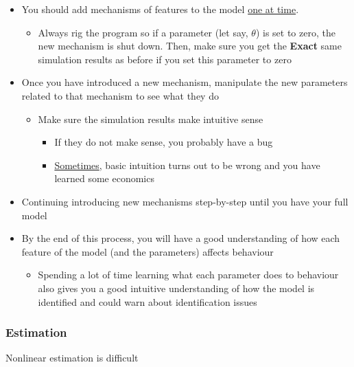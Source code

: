 \documentclass[11pt]{article}
\begin{document}
\begin{itemize}
\item You should add mechanisms of features to the model \uline{one at time}.
\begin{itemize}
\item Always rig the program so if a parameter (let say, \(\theta\)) is set to zero, the new mechanism is shut down. Then, make sure you get the \textbf{Exact} same simulation results as before if you set this parameter to zero
\end{itemize}
\item Once you have introduced a new mechanism, manipulate the new parameters related to that mechanism to see what they do
\begin{itemize}
\item Make sure the simulation results make intuitive sense
\begin{itemize}
\item If they do not make sense, you probably have a bug
\item \uline{Sometimes}, basic intuition turns out to be wrong and you have learned some economics
\end{itemize}
\end{itemize}
\item Continuing introducing new mechanisms step-by-step until you have your full model
\item By the end of this process, you will have a good understanding of how each feature of the model (and the parameters) affects behaviour
\begin{itemize}
\item Spending a lot of time learning what each parameter does to behaviour also gives you a good intuitive understanding of how the model is identified and could warn about identification issues
\end{itemize}
\end{itemize}

\subsubsection{Estimation}
\label{sec:org22dcf2f}

Nonlinear estimation is difficult
\end{document}
